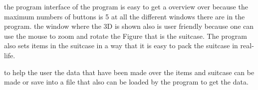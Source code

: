 the program interface of the program is easy to get a overview over because the maximum numbers of buttons is 5 at all the different windows there are in the program. the window where the 3D is shown also is user friendly because one can use the mouse to zoom and rotate the Figure that is the suitcase. The program also sets items in the suitcase in a way that it is easy to pack the suitcase in real-life.

to help the user the data that have been made over the items and suitcase can be made or save into a file that also can be loaded by the program to get the data.